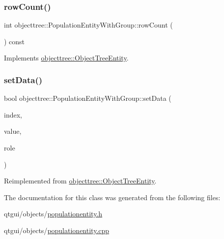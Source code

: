 \mbox{\label{classobjecttree_1_1_population_entity_with_group_a7cc378022e12478bd4144670e568eeb4}} 
\subsubsection{\texorpdfstring{rowCount()}{rowCount()}}
{\footnotesize\ttfamily int objecttree\+::\+Population\+Entity\+With\+Group\+::row\+Count (\begin{DoxyParamCaption}{ }\end{DoxyParamCaption}) const\hspace{0.3cm}{\ttfamily [virtual]}}



Implements \mbox{\hyperlink{classobjecttree_1_1_object_tree_entity_a82c626bb28c55dcfce11cf7ec3368588}{objecttree\+::\+Object\+Tree\+Entity}}.

\mbox{\label{classobjecttree_1_1_population_entity_with_group_aaba042eeff76e900c314f165ca4222a4}} 
\subsubsection{\texorpdfstring{setData()}{setData()}}
{\footnotesize\ttfamily bool objecttree\+::\+Population\+Entity\+With\+Group\+::set\+Data (\begin{DoxyParamCaption}\item[{const Q\+Model\+Index \&}]{index,  }\item[{const Q\+Variant \&}]{value,  }\item[{int}]{role }\end{DoxyParamCaption})\hspace{0.3cm}{\ttfamily [virtual]}}



Reimplemented from \mbox{\hyperlink{classobjecttree_1_1_object_tree_entity_ab6742194e637093cb1571998bee88ff5}{objecttree\+::\+Object\+Tree\+Entity}}.



The documentation for this class was generated from the following files\+:\begin{DoxyCompactItemize}
\item 
qtgui/objects/\mbox{\hyperlink{populationentity_8h}{populationentity.\+h}}\item 
qtgui/objects/\mbox{\hyperlink{populationentity_8cpp}{populationentity.\+cpp}}\end{DoxyCompactItemize}

